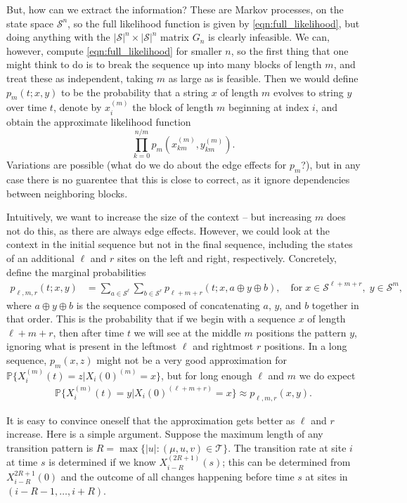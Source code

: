 \documentclass{article}
\renewcommand{\P}{\mathbb{P}}
\newcommand{\calS}{\mathcal{S}}  %
\newcommand{\calT}{\mathcal{T}}  %
\newcommand{\join}{\oplus}  %
\theoremstyle{definition}
\begin{document}
But, how can we extract the information?
These are Markov processes, on the state space $\calS^n$, 
so the full likelihood function is given by \eqref{eqn:full_likelihood},
but doing anything with the $|\calS|^n \times |\calS|^n$ matrix $G_n$ is clearly infeasible.
We can, however, compute \eqref{eqn:full_likelihood} for smaller $n$,
so the first thing that one might think to do is to break the sequence up into many blocks of length $m$,
and treat these as independent, taking $m$ as large as is feasible.
Then we would define $p_m(t;x,y)$ to be the probability that a string $x$ of length $m$ evolves to string $y$ over time $t$,
denote by $x_i^{(m)}$ the block of length $m$ beginning at index $i$,
and obtain the approximate likelihood function
\[
  \prod_{k=0}^{n/m} p_m(x_{km}^{(m)},y_{km}^{(m)}) .
\]
Variations are possible (what do we do about the edge effects for $p_m$?),
but in any case there is no guarentee that this is close to correct,
as it ignore dependencies between neighboring blocks.

Intuitively, we want to increase the size of the context 
-- but increasing $m$ does not do this, as there are always edge effects.
However, we could look at the context in the initial sequence but not in the final sequence,
including the states of an additional $\ell$ and $r$ sites on the left and right, respectively.
Concretely, define the marginal probabilities
\begin{align}
  p_{\ell,m,r}(t;x,y) &= \sum_{a \in \calS^\ell} \sum_{b \in \calS^r} p_{\ell+m+r}(t;x,a \join y \join b) , \quad \text{for}\; x \in \calS^{\ell+m+r}, \; y \in \calS^m ,
\end{align}
where $a \join y \join b$ is the sequence composed of concatenating $a$, $y$, and $b$ together in that order.
This is the probability that if we begin with a sequence $x$ of length $\ell+m+r$, 
then after time $t$ we will see at the middle $m$ positions the pattern $y$,
ignoring what is present in the leftmost $\ell$ and rightmost $r$ positions.
In a long sequence, $p_m(x,z)$ might not be a very good approximation for $\P\{ X_i^{(m)}(t) = z | X_i(0)^{(m)} = x \}$,
but for long enough $\ell$ and $m$ we do expect
\begin{align}
  \P\{ X_i^{(m)}(t) = y | X_i(0)^{(\ell+m+r)} = x \} \approx p_{\ell,m,r}(x,y) .
\end{align}

It is easy to convince oneself that the approximation gets better as $\ell$ and $r$ increase.
Here is a simple argument.
Suppose the maximum length of any transition pattern is $R = \max\{ |u| : (\mu,u,v) \in \calT \}$.
The transition rate at site $i$ at time $s$ is determined if we know $X_{i-R}^{(2R+1)}(s)$;
this can be determined from $X_{i-R}^{2R+1}(0)$ and the outcome of all changes happening before time $s$ at sites in $(i-R-1, \ldots, i+R)$.
\end{document}

